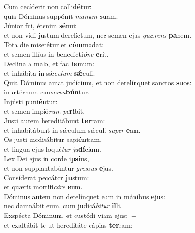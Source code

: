 \oddverse Cum cecíderit non colli\textbf{dé}tur:~\*\\
\oddverse quia Dóminus suppónit \textit{ma}\textit{num} \textbf{su}am.\\
\evenverse Júnior fui, étenim \textbf{sé}nui:~\*\\
\evenverse et non vidi justum derelíctum, nec semen ejus \textit{quæ}\textit{rens} \textbf{pa}nem.\\
\oddverse Tota die miserétur et \textbf{cóm}modat:~\*\\
\oddverse et semen illíus in benedicti\textit{ó}\textit{ne} \textbf{e}rit.\\
\evenverse Declína a malo, et fac \textbf{bo}num:~\*\\
\evenverse et inhábita in sǽ\textit{cu}\textit{lum} \textbf{sǽ}culi.\\
\oddverse Quia Dóminus amat judícium, et non derelínquet sanctos \textbf{su}os:~\*\\
\oddverse in ætérnum con\textit{ser}\textit{va}\textbf{bún}tur.\\
\evenverse Injústi puni\textbf{én}tur:~\*\\
\evenverse et semen impió\textit{rum} \textit{pe}\textbf{rí}bit.\\
\oddverse Justi autem hereditábunt \textbf{ter}ram:~\*\\
\oddverse et inhabitábunt in sǽculum sǽculi \textit{su}\textit{per} \textbf{e}am.\\
\evenverse Os justi meditábitur sapi\textbf{én}tiam,~\*\\
\evenverse et lingua ejus loqué\textit{tur} \textit{ju}\textbf{dí}cium.\\
\oddverse Lex Dei ejus in corde i\textbf{psí}us,~\*\\
\oddverse et non supplantabúntur \textit{gres}\textit{sus} \textbf{e}jus.\\
\evenverse Consíderat peccátor \textbf{ju}stum:~\*\\
\evenverse et quærit mortifi\textit{cá}\textit{re} \textbf{e}um.\\
\oddverse Dóminus autem non derelínquet eum in mánibus \textbf{e}jus:~\*\\
\oddverse nec damnábit eum, cum judicá\textit{bi}\textit{tur} \textbf{il}li.\\
\evenverse Exspécta Dóminum, et custódi viam ejus:~+\\
\evenverse  et exaltábit te ut hereditáte cápias \textbf{ter}ram:~\*\\
